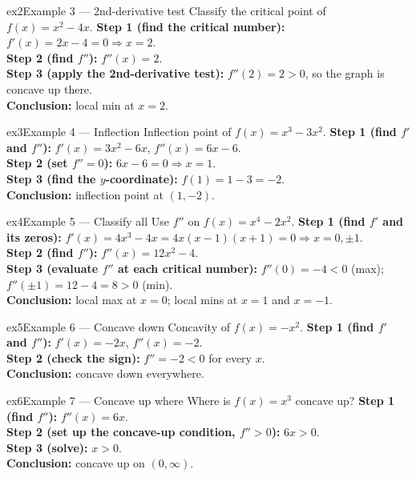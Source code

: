 \documentclass[11pt]{article}
\begin{document}
\begin{example}{ex2}{Example 3 --- 2nd-derivative test}
Classify the critical point of $f(x)=x^2-4x$.\soln
\textbf{Step 1 (find the critical number):} $f'(x)=2x-4=0\Rightarrow x=2$.\\[3pt]
\textbf{Step 2 (find $f''$):} $f''(x)=2$.\\[3pt]
\textbf{Step 3 (apply the 2nd-derivative test):} $f''(2)=2>0$, so the graph is concave up there.\\[3pt]
\textbf{Conclusion:} local min at $x=2$.
\end{example}

\begin{example}{ex3}{Example 4 --- Inflection}
Inflection point of $f(x)=x^3-3x^2$.\soln
\textbf{Step 1 (find $f'$ and $f''$):} $f'(x)=3x^2-6x$, $f''(x)=6x-6$.\\[3pt]
\textbf{Step 2 (set $f''=0$):} $6x-6=0\Rightarrow x=1$.\\[3pt]
\textbf{Step 3 (find the $y$-coordinate):} $f(1)=1-3=-2$.\\[3pt]
\textbf{Conclusion:} inflection point at $(1,-2)$.
\end{example}

\begin{example}{ex4}{Example 5 --- Classify all}
Use $f''$ on $f(x)=x^4-2x^2$.\soln
\textbf{Step 1 (find $f'$ and its zeros):} $f'(x)=4x^3-4x=4x(x-1)(x+1)=0\Rightarrow x=0,\pm1$.\\[3pt]
\textbf{Step 2 (find $f''$):} $f''(x)=12x^2-4$.\\[3pt]
\textbf{Step 3 (evaluate $f''$ at each critical number):} $f''(0)=-4<0$ (max); $f''(\pm1)=12-4=8>0$ (min).\\[3pt]
\textbf{Conclusion:} local max at $x=0$; local mins at $x=1$ and $x=-1$.
\end{example}

\begin{example}{ex5}{Example 6 --- Concave down}
Concavity of $f(x)=-x^2$.\soln
\textbf{Step 1 (find $f'$ and $f''$):} $f'(x)=-2x$, $f''(x)=-2$.\\[3pt]
\textbf{Step 2 (check the sign):} $f''=-2<0$ for every $x$.\\[3pt]
\textbf{Conclusion:} concave down everywhere.
\end{example}

\begin{example}{ex6}{Example 7 --- Concave up where}
Where is $f(x)=x^3$ concave up?\soln
\textbf{Step 1 (find $f''$):} $f''(x)=6x$.\\[3pt]
\textbf{Step 2 (set up the concave-up condition, $f''>0$):} $6x>0$.\\[3pt]
\textbf{Step 3 (solve):} $x>0$.\\[3pt]
\textbf{Conclusion:} concave up on $(0,\infty)$.
\end{example}
\end{document}
